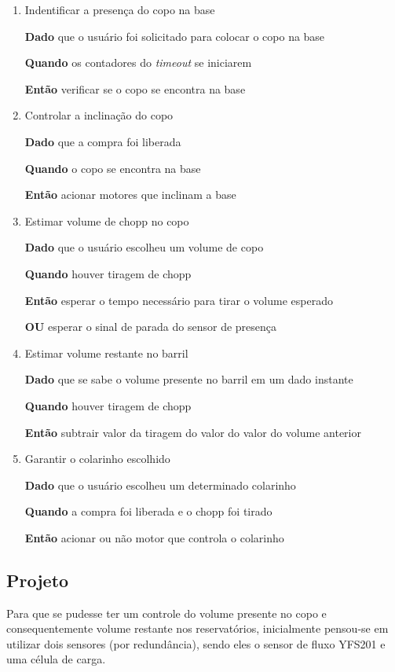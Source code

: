 \begin{enumerate}

\item Indentificar a presença do copo na base

\textbf{Dado} que o usuário foi solicitado para colocar o copo na base 

\textbf{Quando} os contadores do \textit{timeout} se iniciarem

\textbf{Então} verificar se o copo se encontra na base 



\item Controlar a inclinação do copo

\textbf{Dado} que a compra foi liberada

\textbf{Quando} o copo se encontra na base

\textbf{Então} acionar motores que inclinam a base


\item Estimar volume de chopp no copo

\textbf{Dado} que o usuário escolheu um volume de copo

\textbf{Quando} houver tiragem de chopp

\textbf{Então} esperar o tempo necessário para tirar o volume esperado

\textbf{OU} esperar o sinal de parada do sensor de presença



\item Estimar volume restante no barril

\textbf{Dado} que se sabe o volume presente no barril em um dado instante

\textbf{Quando} houver tiragem de chopp

\textbf{Então} subtrair valor da tiragem do valor do valor do volume anterior



\item Garantir o colarinho escolhido

\textbf{Dado} que o usuário escolheu um determinado colarinho

\textbf{Quando} a compra foi liberada e o chopp foi  tirado

\textbf{Então} acionar ou não motor que controla o colarinho

\end{enumerate}


\subsection{Projeto}
Para que se pudesse ter um controle do volume presente no copo e consequentemente volume 
restante nos reservatórios, inicialmente pensou-se em utilizar dois sensores (por redundância), 
sendo eles o sensor de fluxo YFS201 e uma célula de carga.


